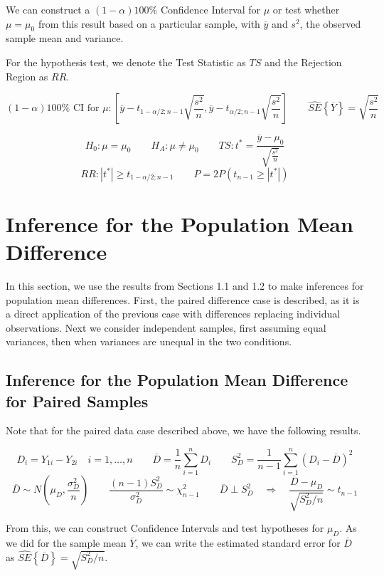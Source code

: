 \documentclass[
]{book}
\begin{document}
We can construct a \((1-\alpha)100\%\) Confidence Interval for \(\mu\)
or test whether \(\mu=\mu_0\) from this result based on a particular
sample, with \(\overline{y}\) and \(s^2\), the observed sample mean and
variance.

For the hypothesis test, we denote the Test Statistic as \(TS\) and the
Rejection Region as \(RR\).

\[
(1-\alpha)100\% \mbox{ CI for } \mu:
\left[\overline{y}-t_{1-\alpha/2;n-1}\sqrt{\frac{s^2}{n}},
\overline{y}-t_{\alpha/2;n-1}\sqrt{\frac{s^2}{n}}\right]
\qquad \hat{SE}\left\{\overline{Y}\right\}=\sqrt{\frac{s^2}{n}}
\]

\[
H_0:\mu=\mu_0 \qquad H_A:\mu \neq \mu_0 \qquad 
TS:t^*=\frac{\overline{y}-\mu_0}{\sqrt{\frac{s^2}{n}}}
\] \[
RR:|t^*|\geq t_{1-\alpha/2;n-1} 
\qquad P=2P\left(t_{n-1}\geq|t^*|\right)
\]

\section{Inference for the Population Mean
Difference}\label{inference-for-the-population-mean-difference}

In this section, we use the results from Sections 1.1 and 1.2 to make
inferences for population mean differences. First, the paired difference
case is described, as it is a direct application of the previous case
with differences replacing individual observations. Next we consider
independent samples, first assuming equal variances, then when variances
are unequal in the two conditions.

\subsection{Inference for the Population Mean Difference for Paired
Samples}\label{inference-for-the-population-mean-difference-for-paired-samples}

Note that for the paired data case described above, we have the
following results.

\[
D_i=Y_{1i}-Y_{2i} \quad i=1,\ldots,n \qquad \overline{D}=\frac{1}{n}\sum_{i=1}^nD_i   \qquad  
S_D^2 = \frac{1}{n-1}\sum_{i=1}^n\left(D_i-\overline{D}\right)^2
\] \[
\overline{D} \sim N\left(\mu_D,\frac{\sigma_D^2}{n}\right)  \qquad
\frac{(n-1)S_D^2}{\sigma_D^2}\sim \chi_{n-1}^2  \qquad \overline{D} \perp S_D^2
\quad \Rightarrow \quad \frac{\overline{D}-\mu_D}{\sqrt{S_D^2/n}}\sim t_{n-1}
\]

From this, we can construct Confidence Intervals and test hypotheses for
\(\mu_D\). As we did for the sample mean \(\overline{Y}\), we can write
the estimated standard error for \(\overline{D}\) as
\(\hat{SE}\left\{\overline{D}\right\}=\sqrt{S_D^2/n}\).
\end{document}
